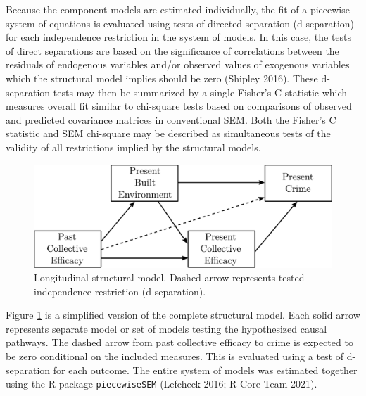 \documentclass [11pt, proquest] {uwthesis}[2015/03/03]
\begin{document}
Because the component models are estimated individually, the fit of a piecewise system of equations is evaluated using tests of directed separation (d-separation) for each independence restriction in the system of models. In this case, the tests of direct separations are based on the significance of correlations between the residuals of endogenous variables and/or observed values of exogenous variables which the structural model implies should be zero (Shipley 2016). These d-separation tests may then be summarized by a single Fisher's C statistic which measures overall fit similar to chi-square tests based on comparisons of observed and predicted covariance matrices in conventional SEM. Both the Fisher's C statistic and SEM chi-square may be described as simultaneous tests of the validity of all restrictions implied by the structural models.\linebreak
\linebreak
\begin{figure}
\includegraphics[width=1\linewidth]{./figure/ch2/longitudinal_models} \caption[Longitudinal structural model.]{Longitudinal structural model. Dashed arrow represents tested independence restriction (d-separation).}\label{fig:longmodels}
\end{figure}
Figure \ref{fig:longmodels} is a simplified version of the complete structural model. Each solid arrow represents separate model or set of models testing the hypothesized causal pathways. The dashed arrow from past collective efficacy to crime is expected to be zero conditional on the included measures. This is evaluated using a test of d-separation for each outcome. The entire system of models was estimated together using the R package \texttt{piecewiseSEM} (Lefcheck 2016; R Core Team 2021).
\end{document}

